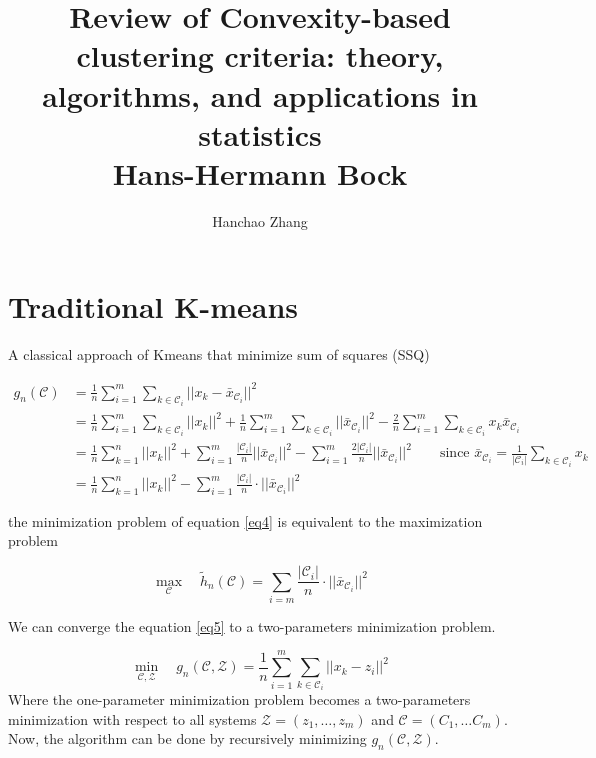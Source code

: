 \documentclass{article}
\begin{document}
\title{Review of Convexity-based clustering criteria: theory, algorithms, and applications in statistics \\ \vspace{0.5cm} \small{Hans-Hermann Bock}}

\author{Hanchao Zhang}

\maketitle

\section{Traditional K-means}

A classical approach of Kmeans that minimize sum of squares (SSQ)

\begin{align}
	g_n(\mathcal C) &= \frac{1}{n}\sum_{i=1}^m \sum_{k\in \mathcal C_i} ||x_k - \bar x_{\mathcal C_i}||^2 \\
	& = \frac{1}{n}\sum_{i=1}^m \sum_{k\in \mathcal C_i} ||x_k||^2 + \frac{1}{n} \sum_{i=1}^m \sum_{k\in \mathcal C_i} ||\bar x_{\mathcal C_i}||^2 - \frac{2}{n}\sum_{i=1}^m \sum_{k\in \mathcal C_i} x_k\bar x_{\mathcal C_i}\\
	& = \frac{1}{n} \sum_{k=1}^n ||x_k||^2 + \sum_{i=1}^m \frac{|\mathcal C_i|}{n}||\bar x_{\mathcal C_i}||^2 - \sum_{i=1}^m \frac{2|\mathcal C_i|}{n}||\bar x_{\mathcal C_i}||^2 \quad\quad \text{since }\bar x_{\mathcal C_i} = \frac{1}{|\mathcal C_i|}\sum_{k\in\mathcal C_i}x_k \\
	& = \frac{1}{n} \sum_{k=1}^n ||x_k||^2 - \sum_{i=1}^m \frac{|\mathcal C_i|}{n}\cdot||\bar x_{\mathcal C_i}||^2 \label{eq4}
\end{align}

the minimization problem of equation \ref{eq4} is equivalent to the maximization problem 

\begin{equation}\label{eq5}
	\max_{\mathcal C}\quad \tilde h_n(\mathcal C) = \sum_{i=m} \frac{|\mathcal C_i|}{n}\cdot||\bar x_{\mathcal C_i}||^2
\end{equation}

We can converge the equation \ref{eq5} to a two-parameters minimization problem.

\begin{equation}
	\min_{\mathcal C,\mathcal Z} \quad g_n(\mathcal C, \mathcal Z) = \frac{1}{n}\sum_{i=1}^m\sum_{k\in\mathcal C_i}||x_k - z_i||^2
\end{equation}
Where the one-parameter minimization problem becomes a two-parameters minimization with respect to all systems $\mathcal Z = (z_1,\ldots, z_m)$ and $\mathcal C = (C_1,\ldots C_m)$. Now, the algorithm can be done by recursively minimizing $g_n(\mathcal C, \mathcal Z)$.
\end{document}
